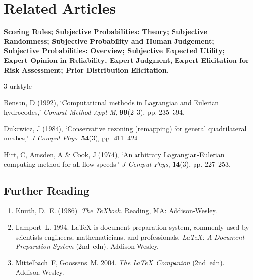 \documentclass[cmbright]{WileySTAT-V1} %
\theoremstyle{plain}
\begin{document}
%
%

\section*{Related Articles}

\textbf{Scoring Rules; Subjective Probabilities: Theory; Subjective Randomness; Subjective Probability
and Human Judgement; Subjective Probabilities: Overview; Subjective Expected Utility; Expert
Opinion in Reliability; Expert Judgment; Expert Elicitation for Risk Assessment; Prior Distribution
Elicitation.}


\begin{thebibliography}{3}
\newcommand{\enquote}[1]{`#1'}
\providecommand{\natexlab}[1]{#1}
\expandafter\ifx\csname urlstyle\endcsname\relax
 \providecommand{\doi}[1]{doi:\discretionary{}{}{}#1}\else
 \providecommand{\doi}{doi:\discretionary{}{}{}\begingroup
 \urlstyle{rm}\Url}\fi

Benson, D (1992), \enquote{Computational methods in {L}agrangian and {E}ulerian
 hydrocodes,} \emph{Comput {M}ethod {A}ppl {M}}, \textbf{99}(2--3), pp.
 235--394.

Dukowicz, J (1984), \enquote{Conservative rezoning (remapping) for general
 quadrilateral meshes,} \emph{J {C}omput {P}hys}, \textbf{54}(3), pp.
 411--424.

Hirt, C, Amsden, A \& Cook, J (1974), \enquote{An arbitrary
 {L}agrangian-{E}ulerian computing method for all flow speeds,} \emph{J
 {C}omput {P}hys}, \textbf{14}(3), pp. 227--253.

\end{thebibliography}


\subsection*{Further Reading}
\begin{enumerate}
\item Knuth, D.~E. (1986). \textit{The {\TeX}book}. Reading, MA: Addison-Wesley.

\item Lamport~L. 1994. LaTeX is document preparation system, commonly used by scientists engineers, mathematicians, and professionals. \textit{\LaTeX: A Document Preparation System} (2nd~edn). Addison-Wesley.

\item Mittelbach~F, Goossens~M. 2004. \textit{The \LaTeX\ Companion} (2nd~edn). Addison-Wesley.
\end{enumerate}
\end{document}
